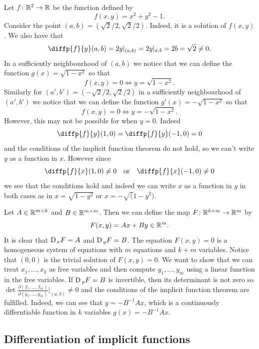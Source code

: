 \documentclass[11pt,a4paper]{article}
\begin{document}
\begin{example}
  Let $f \colon \mathbb{R}^2 \to \mathbb{R}$ be the function defined by
  \[
    f(x,y) = x^2 + y^2 - 1.
  \]
  Consider the point $(a,b) = (\sqrt{2}/2,\sqrt{2}/2)$.
  Indeed, it is a solution of $f(x,y)$.
  We also have that
  \[
    \diffp{f}{y}(a,b) =
    2y\vert_{(a,b)} =
    2y\vert_{a,b} =
    2b = \sqrt{2} \neq 0.
  \]
  In a sufficiently neighbourhood of $(a,b)$ we notice that we can
  define the function $g(x) = \sqrt{1 - x^2}$ so that
  \[
    f(x,y) = 0 \iff y = \sqrt{1 - x^2}.
  \]
  Similarly for $(a',b') = (-\sqrt{2}/2,\sqrt{2}/2)$ in a
  sufficiently neighbourhood of $(a',b')$ we notice that we can
  define the function $g'(x) = -\sqrt{1 - x^2}$ so that
  \[
    f(x,y) = 0 \iff y = -\sqrt{1 - x^2}.
  \]
  However, this may not be possible for when $y = 0$.
  Indeed
  \[
    \diffp{f}{y}(1,0) =
    \diffp{f}{y}(-1,0) =
    0
  \]
  and the conditions of the implicit function theorem do not hold,
  so we can't write $y$ as a function in $x$.
  However since
  \[
    \diffp{f}{x}(1,0) \neq 0 \tor
    \diffp{f}{x}(-1,0) \neq 0
  \]
  we see that the conditions hold and indeed we can write $x$
  as a function in $y$
  in both cases as in $x = \sqrt{1 - y^2}$ or $x = -\sqrt(1 - y^2)$.
\end{example}

\begin{example}
  \label{exmp:implicit-function-linear}
  Let $A \in \mathbb{R}^{m \times k}$ and $B \in \mathbb{R}^{m \times m}$.
  Then we can define the map $F \colon \mathbb{R}^{k + m} \to \mathbb{R}^m$ by
  \[
    F(x,y) = Ax + By \in \mathbb{R}^{m}.
  \]
  It is clear that $\mathrm{D}_{\,x} F = A$ and $\mathrm{D}_{\,y} F = B$.
  The equation $F(x,y) = 0$ is a homogeneous system of equations
  with $m$ equations and $k + m$ variables.
  Notice that $(0,0)$ is the trivial solution of $F(x,y) = 0$.
  We want to show that we can treat $x_1,\dots,x_k$ as free variables
  and then compute $y_1,\dots,y_m$
  using a linear function in the free variables.
  If $\mathrm{D}_{\,y} F = B$ is invertible,
  then its determinant is not zero so $\det
  \frac{\partial(f_1,\dots,f_m)}{\partial(y_1,\dots,y_m)}\vert_{(a,b)} \neq 0$
  and the conditions of the implicit function theorem are fulfilled.
  Indeed, we can see that $y = -B^{-1} A x$,
  which is a continuously differntiable function in $k$
  variables $g(x) = -B^{-1} A x$.
\end{example}

\subsection{Differentiation of implicit functions}
\end{document}
